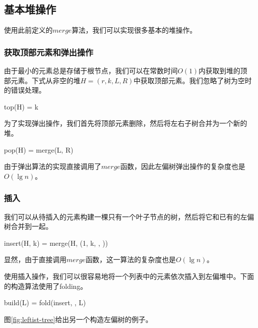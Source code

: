 \documentclass[b5paper]{ctexart}
\begin{document}
\subsection{基本堆操作}

使用此前定义的$merge$算法，我们可以实现很多基本的堆操作。

\subsubsection{获取顶部元素和弹出操作}

由于最小的元素总是存储于根节点，我们可以在常数时间$O(1)$内获取到堆的顶部元素。下式从非空的堆$H = (r, k, L, R)$中获取顶部元素。我们忽略了树为空时的错误处理。

\be
top(H) = k
\ee

为了实现弹出操作，我们首先将顶部元素删除，然后将左右子树合并为一个新的堆。

\be
pop(H) = merge(L, R)
\ee

由于弹出算法的实现直接调用了$merge$函数，因此左偏树弹出操作的复杂度也是$O(\lg n)$。

\subsubsection{插入}

我们可以从待插入的元素构建一棵只有一个叶子节点的树，然后将它和已有的左偏树合并到一起。

\be
insert(H, k) = merge(H, (1, k, \phi, \phi))
\ee

显然，由于直接调用$merge$函数，这一算法的复杂度也是$O(\lg n)$。

使用插入操作，我们可以很容易地将一个列表中的元素依次插入到左偏堆中。下面的构造算法使用了folding。

\be
build(L) = fold(insert, \phi, L)
\ee

图\ref{fig:leftist-tree}给出另一个构造左偏树的例子。
\end{document}
